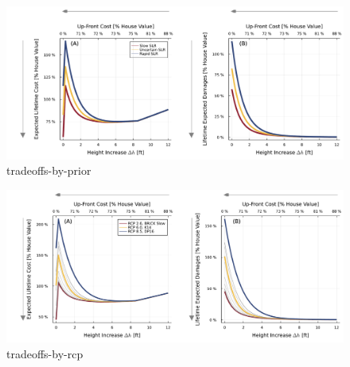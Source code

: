 \documentclass[12pt]{article}
\begin{document}
\begin{figure}
    \centering
    \includegraphics[width=\textwidth]{tradeoffs-by-prior}
    \caption{tradeoffs-by-prior}\label{fig:tradeoffs-by-prior}
\end{figure}

\begin{figure}
    \centering
    \includegraphics[width=\textwidth]{tradeoffs-by-rcp}
    \caption{tradeoffs-by-rcp}\label{fig:tradeoffs-by-rcp}
\end{figure}
\end{document}
